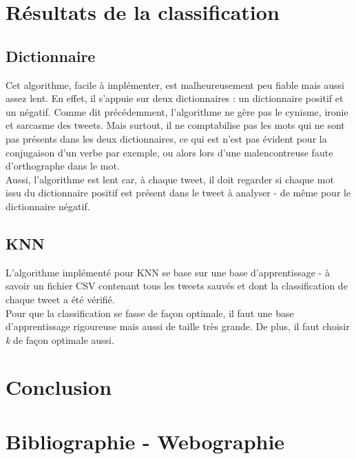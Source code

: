 \documentclass[pdftex,12pt,a4paper]{report}
\begin{document}
\begin{spacing}{1.2}
\chapter{Résultats de la classification}

\section{Dictionnaire}

Cet algorithme, facile à implémenter, est malheureusement peu fiable mais aussi assez lent. En effet, il s'appuie sur deux dictionnaires : un dictionnaire positif et un négatif. Comme dit précédemment, l'algorithme ne gère pas le cynisme, ironie et sarcasme des tweets. Mais surtout, il ne comptabilise pas les mots qui ne sont pas présents dans les deux dictionnaires, ce qui est n'est pas évident pour la conjugaison d'un verbe par exemple, ou alors lors d'une malencontreuse faute d'orthographe dans le mot.
\\
Aussi, l'algorithme est lent car, à chaque tweet, il doit regarder si chaque mot issu du dictionnaire positif est présent dans le tweet à analyser - de même pour le dictionnaire négatif.

\section{KNN}

L'algorithme implémenté pour KNN se base sur une base d'apprentissage - à savoir un fichier CSV contenant tous les tweets sauvés et dont la classification de chaque tweet a été vérifié.
\\
Pour que la classification se fasse de façon optimale, il faut une base d'apprentissage rigoureuse mais aussi de taille très grande. De plus, il faut choisir \textit{k} de façon optimale aussi.

\chapter{Conclusion}

\chapter*{Bibliographie - Webographie}

\end{spacing}
\end{document}
